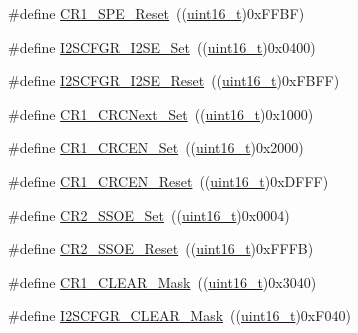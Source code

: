 \begin{DoxyCompactItemize}
\item 
\#define \hyperlink{group___s_p_i___private___defines_ga7074d384e7f175968d1497a9275232bf}{C\+R1\+\_\+\+S\+P\+E\+\_\+\+Reset}~((\hyperlink{_p_e___types_8h_a1f1825b69244eb3ad2c7165ddc99c956}{uint16\+\_\+t})0x\+F\+F\+B\+F)
\item 
\#define \hyperlink{group___s_p_i___private___defines_gaded516c1bc1f0cb578174af3e296621b}{I2\+S\+C\+F\+G\+R\+\_\+\+I2\+S\+E\+\_\+\+Set}~((\hyperlink{_p_e___types_8h_a1f1825b69244eb3ad2c7165ddc99c956}{uint16\+\_\+t})0x0400)
\item 
\#define \hyperlink{group___s_p_i___private___defines_ga0ba63ca824d68ed9a84eafd6f4d64a3a}{I2\+S\+C\+F\+G\+R\+\_\+\+I2\+S\+E\+\_\+\+Reset}~((\hyperlink{_p_e___types_8h_a1f1825b69244eb3ad2c7165ddc99c956}{uint16\+\_\+t})0x\+F\+B\+F\+F)
\item 
\#define \hyperlink{group___s_p_i___private___defines_gaed3a2181ca4095a6488cf6c0ad7a29c6}{C\+R1\+\_\+\+C\+R\+C\+Next\+\_\+\+Set}~((\hyperlink{_p_e___types_8h_a1f1825b69244eb3ad2c7165ddc99c956}{uint16\+\_\+t})0x1000)
\item 
\#define \hyperlink{group___s_p_i___private___defines_gae0b545cdda02753c8e8863e883268011}{C\+R1\+\_\+\+C\+R\+C\+E\+N\+\_\+\+Set}~((\hyperlink{_p_e___types_8h_a1f1825b69244eb3ad2c7165ddc99c956}{uint16\+\_\+t})0x2000)
\item 
\#define \hyperlink{group___s_p_i___private___defines_gadd72ac04e7b2ff17053db04d240e17b1}{C\+R1\+\_\+\+C\+R\+C\+E\+N\+\_\+\+Reset}~((\hyperlink{_p_e___types_8h_a1f1825b69244eb3ad2c7165ddc99c956}{uint16\+\_\+t})0x\+D\+F\+F\+F)
\item 
\#define \hyperlink{group___s_p_i___private___defines_gaae3c2720c0b63d7cc26046969a45a6c1}{C\+R2\+\_\+\+S\+S\+O\+E\+\_\+\+Set}~((\hyperlink{_p_e___types_8h_a1f1825b69244eb3ad2c7165ddc99c956}{uint16\+\_\+t})0x0004)
\item 
\#define \hyperlink{group___s_p_i___private___defines_ga475caaaef8732d35e4c6fd3f21dc4e3c}{C\+R2\+\_\+\+S\+S\+O\+E\+\_\+\+Reset}~((\hyperlink{_p_e___types_8h_a1f1825b69244eb3ad2c7165ddc99c956}{uint16\+\_\+t})0x\+F\+F\+F\+B)
\item 
\#define \hyperlink{group___s_p_i___private___defines_ga67f7dd35ea3d1296677e5fc50b88fa90}{C\+R1\+\_\+\+C\+L\+E\+A\+R\+\_\+\+Mask}~((\hyperlink{_p_e___types_8h_a1f1825b69244eb3ad2c7165ddc99c956}{uint16\+\_\+t})0x3040)
\item 
\#define \hyperlink{group___s_p_i___private___defines_ga6cd1ac4e83d8de8e32a407d1a7971389}{I2\+S\+C\+F\+G\+R\+\_\+\+C\+L\+E\+A\+R\+\_\+\+Mask}~((\hyperlink{_p_e___types_8h_a1f1825b69244eb3ad2c7165ddc99c956}{uint16\+\_\+t})0x\+F040)

\end{DoxyCompactItemize}

